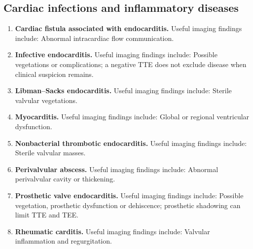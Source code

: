 \subsection{Cardiac infections and inflammatory diseases}
\begin{enumerate}[leftmargin=*,itemsep=0.45em,topsep=0.4em]
\item \textbf{Cardiac fistula associated with endocarditis.} Useful imaging findings include: Abnormal intracardiac flow communication.
\item \textbf{Infective endocarditis.} Useful imaging findings include: Possible vegetations or complications; a negative TTE does not exclude disease when clinical suspicion remains.
\item \textbf{Libman--Sacks endocarditis.} Useful imaging findings include: Sterile valvular vegetations.
\item \textbf{Myocarditis.} Useful imaging findings include: Global or regional ventricular dysfunction.
\item \textbf{Nonbacterial thrombotic endocarditis.} Useful imaging findings include: Sterile valvular masses.
\item \textbf{Perivalvular abscess.} Useful imaging findings include: Abnormal perivalvular cavity or thickening.
\item \textbf{Prosthetic valve endocarditis.} Useful imaging findings include: Possible vegetation, prosthetic dysfunction or dehiscence; prosthetic shadowing can limit TTE and TEE.
\item \textbf{Rheumatic carditis.} Useful imaging findings include: Valvular inflammation and regurgitation.
\end{enumerate}

